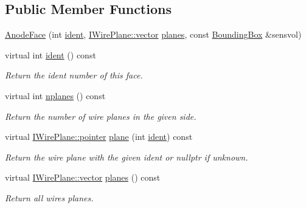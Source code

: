 \subsection*{Public Member Functions}
\begin{DoxyCompactItemize}
\item 
\hyperlink{class_wire_cell_1_1_gen_1_1_anode_face_aa01e7fc2f74294dac3babc087c9e790f}{Anode\+Face} (int \hyperlink{class_wire_cell_1_1_gen_1_1_anode_face_a57abc0570f11b050da061e694507b17d}{ident}, \hyperlink{class_wire_cell_1_1_i_component_a18978d88ce697af5941655a89660fd4e}{I\+Wire\+Plane\+::vector} \hyperlink{class_wire_cell_1_1_gen_1_1_anode_face_abfc7fb985b42b9f5ba891a8f6986d526}{planes}, const \hyperlink{class_wire_cell_1_1_bounding_box}{Bounding\+Box} \&sensvol)
\item 
virtual int \hyperlink{class_wire_cell_1_1_gen_1_1_anode_face_a57abc0570f11b050da061e694507b17d}{ident} () const
\begin{DoxyCompactList}\small\item\em Return the ident number of this face. \end{DoxyCompactList}\item 
virtual int \hyperlink{class_wire_cell_1_1_gen_1_1_anode_face_aa4becde47c5ca6e98a08674a61b33b72}{nplanes} () const
\begin{DoxyCompactList}\small\item\em Return the number of wire planes in the given side. \end{DoxyCompactList}\item 
virtual \hyperlink{class_wire_cell_1_1_interface_a09c548fb8266cfa39afb2e74a4615c37}{I\+Wire\+Plane\+::pointer} \hyperlink{class_wire_cell_1_1_gen_1_1_anode_face_a6ed6d7c6614695d5ace93aa10b0d2478}{plane} (int \hyperlink{class_wire_cell_1_1_gen_1_1_anode_face_a57abc0570f11b050da061e694507b17d}{ident}) const
\begin{DoxyCompactList}\small\item\em Return the wire plane with the given ident or nullptr if unknown. \end{DoxyCompactList}\item 
virtual \hyperlink{class_wire_cell_1_1_i_component_a18978d88ce697af5941655a89660fd4e}{I\+Wire\+Plane\+::vector} \hyperlink{class_wire_cell_1_1_gen_1_1_anode_face_abfc7fb985b42b9f5ba891a8f6986d526}{planes} () const
\begin{DoxyCompactList}\small\item\em Return all wires planes. \end{DoxyCompactList}\item 

\end{DoxyCompactItemize}
